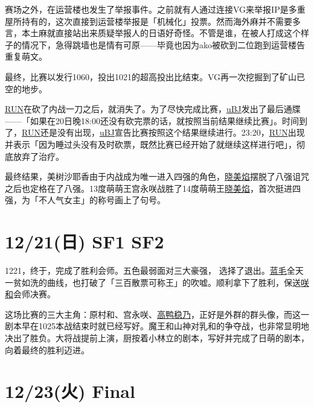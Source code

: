 赛场之外，在运营楼也发生了举报事件。之前就有人通过连接VG来举报IP是多重屋所持有的，这次直接到运营楼举报是「机械化」投票。然而海外麻并不需要多言，本土麻就直接站出来质疑举报人的日语好奇怪。不管是谁，在被人打成这个样子的情况下，急得跳墙也是情有可原——毕竟也因为ako被砍到二位跑到运营楼告重复萌文。

最终，比赛以发行1060，投出1021的超高投出比结束。VG再一次挖掘到了矿山已空的地步。

\uline{RUN}在砍了内战一刀之后，就消失了。为了尽快完成比赛，\uline{uBJ}发出了最后通牒——「如果在20日晚18:00还没有砍完票的话，就按照当前结果继续比赛」。时间到了，\uline{RUN}还是没有出现，\uline{uBJ}宣告比赛按照这个结果继续进行。23:20，\uline{RUN}出现并表示「因为睡过头没有及时砍票，既然比赛已经开始了就继续这样进行吧」，彻底放弃了治疗。

最终结果，美树沙耶香由于内战成为唯一进入四强的角色，\uline{晓美焰}摆脱了八强诅咒之后也定格在了八强。13度萌萌王宫永咲战胜了14度萌萌王\uline{晓美焰}，首次挺进四强，为「不人气女主」的称号画上了句号。

\section{12/21(日) SF1 SF2}



1221，终于，完成了胜利会师。五色最弱面对三大豪强， 选择了退出。\uline{蓝毛}全天一贫如洗的曲线，也打破了「三百散票可称王」的吹嘘。顺利拿下了胜利，保送\uline{咲}\uline{和}会师决赛。

这场比赛的三大主角：原村和、宫永咲、\uline{高鸭稳乃}，正好是外群的群头像，而这一剧本早在1025本战结束时就已经写好。魔王和山神对乳和的争夺战，也非常显明地决出了胜负。大将战提前上演，厨按着小林立的剧本，写好并完成了日萌的剧本，向着最终的胜利迈进。

\section{12/23(火) Final}


